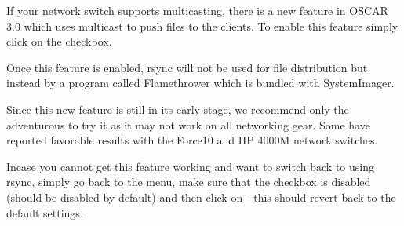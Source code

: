 If your network switch supports multicasting, there is a new feature in
OSCAR 3.0 which uses multicast to push files to the clients.  To enable
this feature simply click on the  checkbox.

Once this feature is enabled, rsync will not be used for file distribution
but instead by a program called Flamethrower which is bundled with
SystemImager.

Since this new feature is still in its early stage, we recommend only the
adventurous to try it as it may not work on all networking gear.  Some
have reported favorable results with the Force10 and HP 4000M network
switches.

Incase you cannot get this feature working and want to switch back
to using rsync, simply go back to the 
menu, make sure that the  checkbox is
disabled (should be disabled by default) and then click on
 - this should revert back to the
default settings.


